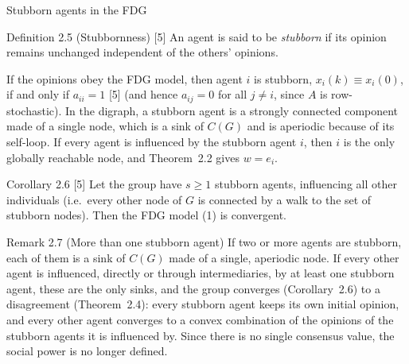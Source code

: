 \begin{frame}[label=bk-stubborn]{Stubborn agents in the FDG}
  \scriptsize
  \begin{block}{Definition 2.5 (Stubbornness) [5]}
    An agent is said to be \emph{stubborn} if its opinion remains unchanged independent of
    the others' opinions.
  \end{block}
  If the opinions obey the FDG model, then agent $i$ is stubborn, $x_i(k) \equiv x_i(0)$,
  if and only if $a_{ii} = 1$ [5] (and hence $a_{ij} = 0$ for all $j \neq i$, since $A$ is
  row-stochastic). In the digraph, a stubborn agent is a strongly connected component made
  of a single node, which is a sink of $C(G)$ and is aperiodic because of its self-loop.
  If every agent is influenced by the stubborn agent $i$, then $i$ is the only globally
  reachable node, and Theorem~2.2 gives $w = e_i$.
  \begin{block}{Corollary 2.6 [5]}
    Let the group have $s \geq 1$ stubborn agents, influencing all other individuals (i.e.\
    every other node of $G$ is connected by a walk to the set of stubborn nodes). Then the
    FDG model (1) is convergent.
  \end{block}
  \begin{block}{Remark 2.7 (More than one stubborn agent)}
    If two or more agents are stubborn, each of them is a sink of $C(G)$ made of a single,
    aperiodic node. If every other agent is influenced, directly or through intermediaries,
    by at least one stubborn agent, these are the only sinks, and the group converges
    (Corollary~2.6) to a disagreement (Theorem~2.4): every stubborn agent keeps its own
    initial opinion, and every other agent converges to a convex combination of the
    opinions of the stubborn agents it is influenced by. Since there is no single consensus
    value, the social power is no longer defined.
  \end{block}
\end{frame}

